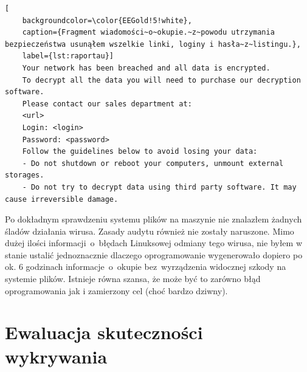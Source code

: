 \begin{lstlisting}[
    backgroundcolor=\color{EEGold!5!white},
    caption={Fragment wiadomości~o~okupie.~z~powodu utrzymania bezpieczeństwa usunąłem wszelkie linki, loginy i hasła~z~listingu.},
    label={lst:raportau}]
    Your network has been breached and all data is encrypted.
    To decrypt all the data you will need to purchase our decryption software.
    Please contact our sales department at:
    <url>
    Login: <login>
    Password: <password>
    Follow the guidelines below to avoid losing your data:
    - Do not shutdown or reboot your computers, unmount external storages.
    - Do not try to decrypt data using third party software. It may cause irreversible damage.
\end{lstlisting}
Po dokładnym sprawdzeniu systemu plików na maszynie nie znalazłem żadnych śladów działania wirusa. Zasady audytu również nie zostały naruszone. Mimo dużej ilości informacji~o~błędach Linuksowej odmiany tego wirusa, nie byłem w stanie ustalić jednoznacznie dlaczego oprogramowanie wygenerowało dopiero po ok. 6 godzinach informacje~o~okupie bez~wyrządzenia widocznej szkody na systemie plików. Istnieje równa szansa, że może być to zarówno błąd oprogramowania jak i zamierzony cel (choć bardzo dziwny).

\section{Ewaluacja skuteczności wykrywania}

